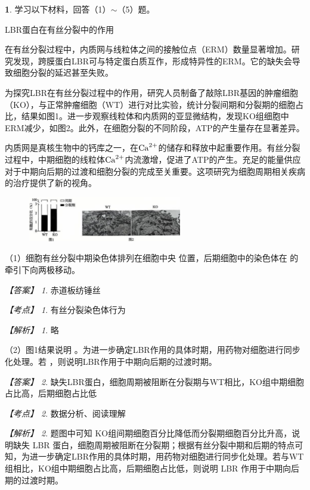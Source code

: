 \documentclass[UTF8, 10pt, a4paper, oneside]{ctexart}
\newcommand{\blank}{ \underbar{\quad$\blacktriangle$\quad} }%
\newcommand{\fs}[1]{{\fangsong #1}}%
\newcommand{\hei}[1]{{\heiti #1}}
\theoremstyle{definition}
\newtheorem{exercise}{}
\theoremstyle{remark}
\newtheorem*{answer}{【答案】}
\newtheorem*{point}{【考点】}      %
\newtheorem*{explanation}{【解析】}     %
\theoremstyle{plain}
\begin{document}
\begin{exercise}
    学习以下材料，回答（1）$\sim$（5）题。
    \begin{center}
        \hei{LBR蛋白在有丝分裂中的作用}
    \end{center}
    {\kaishu

    在有丝分裂过程中，内质网与线粒体之间的接触位点（ERM）数量显著增加。研究发现，跨膜蛋白LBR可与特定蛋白质互作，形成特异性的ERM。它的缺失会导致细胞分裂的延迟甚至失败。

    为探究LBR在有丝分裂过程中的作用，研究人员制备了敲除LBR基因的肿瘤细胞（KO），与正常肿瘤细胞（WT）进行对比实验，统计分裂间期和分裂期的细胞占比，结果如图1。进一步观察线粒体和内质网的亚显微结构，发现KO组细胞中ERM减少，如图2。此外，在细胞分裂的不同阶段，ATP的产生量存在显著差异。

    内质网是真核生物中的钙库之一，在$\ce{Ca^2+}$的储存和释放中起重要作用。有丝分裂过程中，中期细胞的线粒体$\ce{Ca^2+}$内流激增，促进了ATP的产生。充足的能量供应对于中期向后期的过渡和细胞分裂的完成至关重要。这项研究为细胞周期相关疾病的治疗提供了新的视角。
    }
    \begin{figure}[h!]
        \centering
        \includegraphics[width=0.6\textwidth]{assists/17-1.jpg}
    \end{figure}

    （1）细胞有丝分裂中期染色体排列在细胞中央\blank 位置，后期细胞中的染色体在\blank 的牵引下向两极移动。

    \begin{answer}
        赤道板\qquad 纺锤丝
    \end{answer}
    \begin{point}
        有丝分裂染色体行为
    \end{point}
    \begin{explanation}
        \fs{略}
    \end{explanation}

    （2）图1结果说明\blank 。为进一步确定LBR作用的具体时期，用药物对细胞进行同步化处理。若\blank ，则说明LBR作用于中期向后期的过渡时期。

    \begin{answer}
        缺失LBR蛋白，细胞周期被阻断在分裂期\qquad 与WT相比，KO组中期细胞占比高，后期细胞占比低
    \end{answer}
    \begin{point}
        数据分析、阅读理解
    \end{point}
    \begin{explanation}
        题图中可知 KO组间期细胞百分比降低而分裂期细胞百分比升高，说明缺失 LBR 蛋白，细胞周期被阻断在分裂期；根据有丝分裂中期和后期的特点可知，为进一步确定LBR作用的具体时期，用药物对细胞进行同步化处理。若与WT组相比，KO组中期细胞占比高，后期细胞占比低，则说明 LBR 作用于中期向后期的过渡时期。
    \end{explanation}


\end{exercise}
\end{document}

